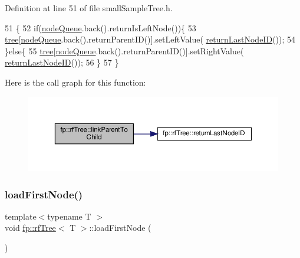 Definition at line 51 of file small\+Sample\+Tree.\+h.


\begin{DoxyCode}
51                                                \{
52                     \textcolor{keywordflow}{if}(\hyperlink{classfp_1_1rfTree_af72d0a2f930fd480dfb4858885c2df23}{nodeQueue}.back().returnIsLeftNode())\{
53                         \hyperlink{classtree}{tree}[\hyperlink{classfp_1_1rfTree_af72d0a2f930fd480dfb4858885c2df23}{nodeQueue}.back().returnParentID()].setLeftValue(
      \hyperlink{classfp_1_1rfTree_a1b8c04f3f3ce362d9627c2ca66d10efd}{returnLastNodeID}());
54                     \}\textcolor{keywordflow}{else}\{
55                         \hyperlink{classtree}{tree}[\hyperlink{classfp_1_1rfTree_af72d0a2f930fd480dfb4858885c2df23}{nodeQueue}.back().returnParentID()].setRightValue(
      \hyperlink{classfp_1_1rfTree_a1b8c04f3f3ce362d9627c2ca66d10efd}{returnLastNodeID}());
56                     \}
57                 \}
\end{DoxyCode}
Here is the call graph for this function\+:
\nopagebreak
\begin{figure}[H]
\begin{center}
\leavevmode
\includegraphics[width=350pt]{classfp_1_1rfTree_aceaedc5d54bb429c1a3539f164a93d45_cgraph}
\end{center}
\end{figure}
\mbox{\label{classfp_1_1rfTree_a8757adc28b68d0a99f95b8bc5d6a38db}} 
\subsubsection{\texorpdfstring{load\+First\+Node()}{loadFirstNode()}\hspace{0.1cm}{\footnotesize\ttfamily [1/2]}}
{\footnotesize\ttfamily template$<$typename T $>$ \\
void \hyperlink{classfp_1_1rfTree}{fp\+::rf\+Tree}$<$ T $>$\+::load\+First\+Node (\begin{DoxyParamCaption}{ }\end{DoxyParamCaption})\hspace{0.3cm}{\ttfamily [inline]}}



